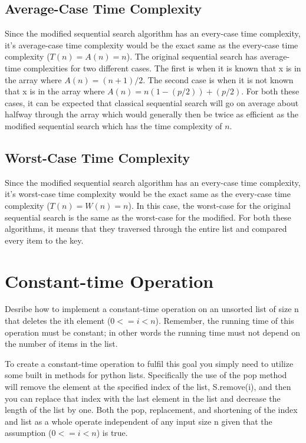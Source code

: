 \documentclass[11pt]{article}
\begin{document}
\subsection*{Average-Case Time Complexity}
Since the modified sequential search algorithm has an every-case time complexity, it's average-case time complexity would be the exact same as the every-case time complexity ($T(n)=A(n)=n$). The original sequential search has average-time complexities for two different cases. The first is when it is known that x is in the array where $A(n)= (n+1)/2$. The second case is when it is not known that x is in the array where $A(n)=n(1-(p/2))+(p/2)$. For both these cases, it can be expected that classical sequential search will go on average about halfway through the array which would generally then be twice as efficient as the modified sequential search which has the time complexity of $n$.


\subsection*{Worst-Case Time Complexity}
Since the modified sequential search algorithm has an every-case time complexity, it's worst-case time complexity would be the exact same as the every-case time complexity ($T(n)=W(n)=n$). In this case, the worst-case for the original sequential search is the same as the worst-case for the modified. For both these algorithms, it means that they traversed through the entire list and compared every item to the key.



\section{Constant-time Operation}
Desribe how to implement a constant-time operation on an unsorted list of size n that deletes the ith element ($0 <= i < n$). Remember, the running time of this operation must be constant; in other words the running time must not depend on the number of items in the list.

\bigskip 

\bigskip

To create a constant-time operation to fulfil this goal you simply need to utilize some built in methods for python lists. Specifically the use of the pop method will remove the element at the specified index of the list, S.remove(i), and then you can replace that index with the last element in the list and decrease the length of the list by one. Both the pop, replacement, and shortening of the index and list as a whole operate independent of any input size n given that the assumption ($0 <= i < n$) is true.
\end{document}
